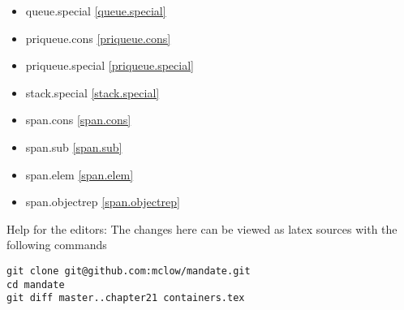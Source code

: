 \begin{multicols}{2}
\begin{itemize}
\item{queue.special     \ref{queue.special}}
\item{priqueue.cons     \ref{priqueue.cons}}
\item{priqueue.special  \ref{priqueue.special}}
\item{stack.special     \ref{stack.special}}
\item{span.cons         \ref{span.cons}}

\item{span.sub        \ref{span.sub}}
\item{span.elem       \ref{span.elem}}
\item{span.objectrep  \ref{span.objectrep}}
\end{itemize}
\end{multicols}

\vfill
Help for the editors: The changes here can be viewed as latex sources with the following commands
\begin{verbatim}
git clone git@github.com:mclow/mandate.git
cd mandate
git diff master..chapter21 containers.tex
\end{verbatim}
\newpage
